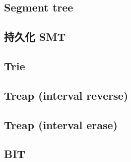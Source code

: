 \documentclass[a4paper,10pt,twocolumn,oneside]{article}
\begin{document}
\subsection{Segment tree}


\subsection{持久化 SMT}


\subsection{Trie}


\subsection{Treap  (interval reverse)}


\subsection{Treap  (interval erase)}


%

\newpage
\subsection{BIT}


% 

%

%
\end{document}
